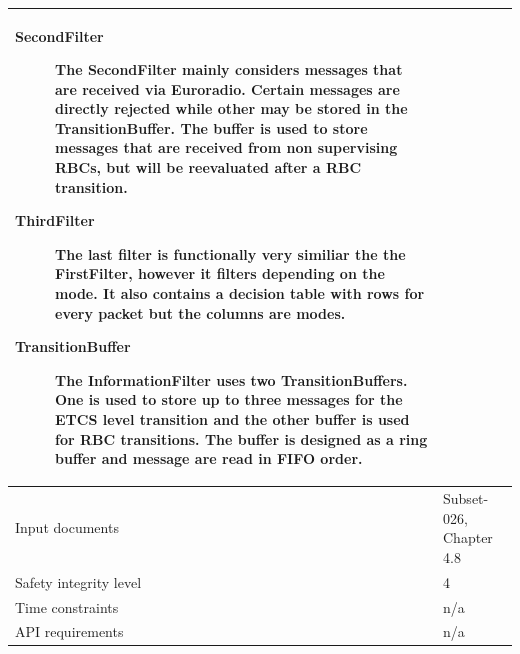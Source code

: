 \begin{longtable}{p{}p{}}
\begin{description}
\item[SecondFilter] The SecondFilter mainly considers messages
that are received via Euroradio. Certain messages are directly
rejected while other may be stored in the TransitionBuffer. The buffer
is used to store messages that are received from non supervising RBCs,
but will be reevaluated after a RBC transition.

\item[ThirdFilter] The last filter is functionally very similiar
the the FirstFilter, however it filters depending on the mode. It also
contains a decision table with rows for every packet but the columns
are modes.

\item[TransitionBuffer] The InformationFilter uses two
TransitionBuffers. One is used to store up to three messages for the
ETCS level transition and the other buffer is used for RBC
transitions. The buffer is designed as a ring buffer and message are
read in FIFO order.
\end{description} \\
\midrule
Input documents	& 
  Subset-026, Chapter 4.8 \\
\midrule
Safety integrity level	& 4 \\
\midrule
Time constraints		& n/a \\
\midrule
API requirements 		& n/a \\
\bottomrule
\end{longtable}

